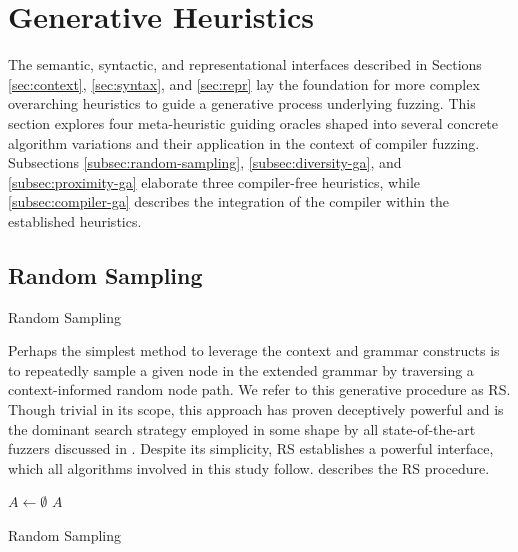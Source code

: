 \section{\label{sec:heuristics}Generative Heuristics}

The semantic, syntactic, and representational interfaces
described in Sections \ref{sec:context}, \ref{sec:syntax}, and \ref{sec:repr}
lay the foundation for more complex overarching heuristics
to guide a generative process underlying fuzzing.
This section explores four meta-heuristic guiding oracles shaped into
several concrete algorithm variations and their application
in the context of compiler fuzzing.
Subsections \ref{subsec:random-sampling}, \ref{subsec:diversity-ga}, and
\ref{subsec:proximity-ga} elaborate three compiler-free heuristics, while \ref{subsec:compiler-ga} describes the integration of the compiler within the established heuristics.


\subsection{\label{subsec:random-sampling} Random Sampling}

 {Random Sampling}

Perhaps the simplest method to leverage the context and grammar constructs
is to repeatedly sample a given node in the extended grammar by traversing a
context-informed random node path.
We refer to this generative procedure as \Gls{RS}.
Though trivial in its scope, this approach has proven deceptively powerful
and is the dominant search strategy employed in some shape by all state-of-the-art
fuzzers discussed in .
Despite its simplicity, \gls{RS} establishes a powerful interface, which
all algorithms involved in this study follow.
 describes the \gls{RS} procedure.

\begin{algorithm}

	\BlankLine
	\DontPrintSemicolon
	$A \gets \emptyset$\;
	\Return $A$\;

	\caption{Random Sampling}
	\label{alg:rs}
\end{algorithm}


